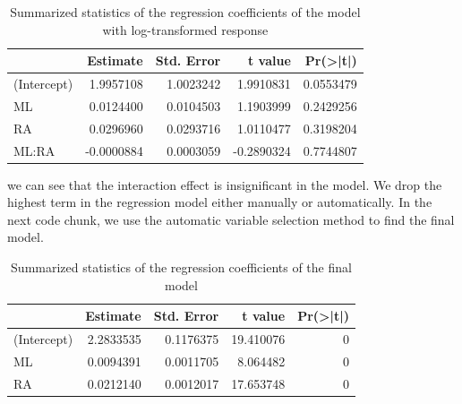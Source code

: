 \documentclass[
]{book}
\newenvironment{Shaded}{\begin{snugshade}}{\end{snugshade}}
\newcommand{\AttributeTok}[1]{\textcolor[rgb]{0.13,0.29,0.53}{#1}}
\newcommand{\DecValTok}[1]{\textcolor[rgb]{0.00,0.00,0.81}{#1}}
\newcommand{\DocumentationTok}[1]{\textcolor[rgb]{0.56,0.35,0.01}{\textbf{\textit{#1}}}}
\newcommand{\FunctionTok}[1]{\textcolor[rgb]{0.13,0.29,0.53}{\textbf{#1}}}
\newcommand{\NormalTok}[1]{#1}
\newcommand{\OtherTok}[1]{\textcolor[rgb]{0.56,0.35,0.01}{#1}}
\newcommand{\SpecialCharTok}[1]{\textcolor[rgb]{0.81,0.36,0.00}{\textbf{#1}}}
\newcommand{\StringTok}[1]{\textcolor[rgb]{0.31,0.60,0.02}{#1}}
\begin{document}
\begin{table}

\caption{\label{tab:unnamed-chunk-162}Summarized statistics of the regression 
      coefficients of the model with log-transformed response}
\centering
\begin{tabular}[t]{l|r|r|r|r}
\hline
  & Estimate & Std. Error & t value & Pr(>|t|)\\
\hline
(Intercept) & 1.9957108 & 1.0023242 & 1.9910831 & 0.0553479\\
\hline
ML & 0.0124400 & 0.0104503 & 1.1903999 & 0.2429256\\
\hline
RA & 0.0296960 & 0.0293716 & 1.0110477 & 0.3198204\\
\hline
ML:RA & -0.0000884 & 0.0003059 & -0.2890324 & 0.7744807\\
\hline
\end{tabular}
\end{table}

we can see that the interaction effect is insignificant in the model. We drop the highest term in the regression model either manually or automatically. In the next code chunk, we use the automatic variable selection method to find the final model.

\begin{Shaded}
\end{Shaded}

\begin{table}

\caption{\label{tab:unnamed-chunk-163}Summarized statistics of the regression 
      coefficients of the final model}
\centering
\begin{tabular}[t]{l|r|r|r|r}
\hline
  & Estimate & Std. Error & t value & Pr(>|t|)\\
\hline
(Intercept) & 2.2833535 & 0.1176375 & 19.410076 & 0\\
\hline
ML & 0.0094391 & 0.0011705 & 8.064482 & 0\\
\hline
RA & 0.0212140 & 0.0012017 & 17.653748 & 0\\
\hline
\end{tabular}
\end{table}
\end{document}

